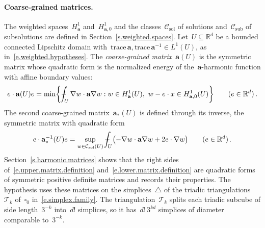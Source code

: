 \documentclass[11pt,letterpaper]{article}
\numberwithin{equation}{section}
\theoremstyle{definition}
\newcommand{\Rd}{\mathbb{R}^d}
\renewcommand{\a}{\mathbf{a}}
\newcommand{\cu}{\square}
\newcommand*{\tr}{\mathrm{trace\,}}
\newcommand{\Hzero}[1]{H^1_{#1,0}}
\newcommand{\Csol}{\mathcal C_{\mathrm{sol}}}
\newcommand{\Csub}{\mathcal C_{\mathrm{sub}}}
\def\Xint#1{\mathchoice
	{\XXint\displaystyle\textstyle{#1}}%
	{\XXint\textstyle\scriptstyle{#1}}%
	{\XXint\scriptstyle\scriptscriptstyle{#1}}%
	{\XXint\scriptscriptstyle\scriptscriptstyle{#1}}%
	\!\int}
\def\XXint#1#2#3{{\setbox0=\hbox{$#1{#2#3}{\int}$}
		\vcenter{\hbox{$#2#3$}}\kern-.5\wd0}}
\def\fint{\Xint-}
\begin{document}
\paragraph{Coarse-grained matrices.} The weighted spaces~$H^1_\a$ and~$\Hzero{\a}$ and the classes~$\Csol$ of solutions and~$\Csub$ of subsolutions are defined in Section~\ref{s.weighted.spaces}. Let~$U\subseteq\Rd$ be a bounded connected Lipschitz domain with~$\tr\a,\tr\a^{-1}\in L^1(U)$, as in~\eqref{e.weighted.hypotheses}. The \emph{coarse-grained matrix}~$\a(U)$ is the symmetric matrix whose quadratic form is the normalized energy of the~$\a$-harmonic function with affine boundary values:
\begin{equation}
	e\cdot\a(U)e=\min\biggl\{\fint_U\nabla w\cdot\a\nabla w:w\in H^1_\a(U),\ w-e\cdot x\in\Hzero{\a}(U)\biggr\}\qquad(e\in\Rd)\,.
	\label{e.upper.matrix.definition}
\end{equation}
The second coarse-grained matrix~$\a_*(U)$ is defined through its inverse, the symmetric matrix with quadratic form
\begin{equation}
	e\cdot\a_*^{-1}(U)e=\sup_{w\in\Csol(U)}\fint_U\bigl(-\nabla w\cdot\a\nabla w+2e\cdot\nabla w\bigr)\qquad(e\in\Rd)\,.
	\label{e.lower.matrix.definition}
\end{equation}
Section~\ref{s.harmonic.matrices} shows that the right sides of~\eqref{e.upper.matrix.definition} and~\eqref{e.lower.matrix.definition} are quadratic forms of symmetric positive definite matrices and records their properties. The hypothesis uses these matrices on the simplices~$\triangle$ of the triadic triangulations~$\mathscr T_k$ of~$\cu_0$ in~\eqref{e.simplex.family}. The triangulation~$\mathscr T_k$ splits each triadic subcube of side length~$3^{-k}$ into~$d!$ simplices, so it has~$d!\,3^{kd}$ simplices of diameter comparable to~$3^{-k}$.
\end{document}
